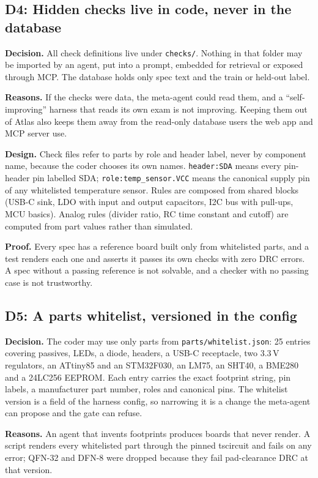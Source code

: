 \documentclass[11pt,a4paper]{article}
\newcommand{\code}[1]{\texttt{#1}}
\begin{document}
\subsection{D4: Hidden checks live in code, never in the database}

\textbf{Decision.} All check definitions live under \code{checks/}. Nothing in that folder may be imported by an agent, put into a prompt, embedded for retrieval or exposed through MCP. The database holds only spec text and the train or held-out label.

\textbf{Reasons.} If the checks were data, the meta-agent could read them, and a ``self-improving'' harness that reads its own exam is not improving. Keeping them out of Atlas also keeps them away from the read-only database users the web app and MCP server use.

\textbf{Design.} Check files refer to parts by role and header label, never by component name, because the coder chooses its own names. \code{header:SDA} means every pin-header pin labelled SDA; \code{role:temp\_sensor.VCC} means the canonical supply pin of any whitelisted temperature sensor. Rules are composed from shared blocks (USB-C sink, LDO with input and output capacitors, I2C bus with pull-ups, MCU basics). Analog rules (divider ratio, RC time constant and cutoff) are computed from part values rather than simulated.

\textbf{Proof.} Every spec has a reference board built only from whitelisted parts, and a test renders each one and asserts it passes its own checks with zero DRC errors. A spec without a passing reference is not solvable, and a checker with no passing case is not trustworthy.

\subsection{D5: A parts whitelist, versioned in the config}

\textbf{Decision.} The coder may use only parts from \code{parts/whitelist.json}: 25 entries covering passives, LEDs, a diode, headers, a USB-C receptacle, two 3.3\,V regulators, an ATtiny85 and an STM32F030, an LM75, an SHT40, a BME280 and a 24LC256 EEPROM. Each entry carries the exact footprint string, pin labels, a manufacturer part number, roles and canonical pins. The whitelist version is a field of the harness config, so narrowing it is a change the meta-agent can propose and the gate can refuse.

\textbf{Reasons.} An agent that invents footprints produces boards that never render. A script renders every whitelisted part through the pinned tscircuit and fails on any error; QFN-32 and DFN-8 were dropped because they fail pad-clearance DRC at that version.
\end{document}
